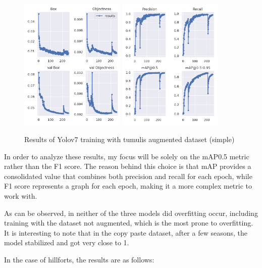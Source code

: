 \begin{figure}[H]
    \centering
    {{\includegraphics[width=5cm]{images/training/mamoas/maia1.png} }}
    \qquad
    {{\includegraphics[width=5cm]{images/training/mamoas/maia2.png} }}
    \caption{Results of Yolov7 training with tumulis augmented dataset (simple)}
    \label{fig:example}
\end{figure}

In order to analyze these results, my focus will be solely on the mAP0.5 metric rather than the F1 score. The reason behind this choice is that mAP provides a consolidated value that combines both precision and recall for each epoch, while F1 score represents a graph for each epoch, making it a more complex metric to work with.

As can be observed, in neither of the three models did overfitting occur, including training with the dataset not augmented, which is the most prone to overfitting. It is interesting to note that in the copy paste dataset, after a few seasons, the model stabilized and got very close to 1.


In the case of hillforts, the results are as follows:

